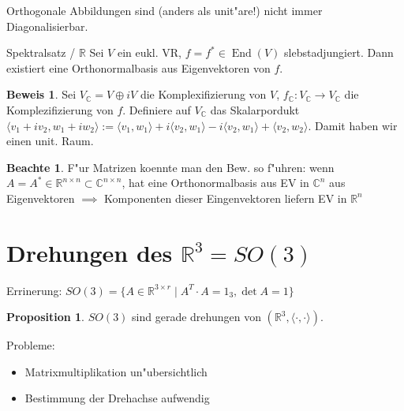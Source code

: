 \documentclass[oneside,fontsize=11pt,paper=a4,BCOR=0mm,DIV=12,automark,headsepline]{scrbook}
\DeclareMathOperator{\mEnd}{End}
\theoremstyle{remark}
\theoremstyle{definition}
\newtheorem*{notte}{Beachte}
\newtheorem*{proposition}{Proposition}
\theoremstyle{definition}
\newtheorem*{prof}{Beweis}
\theoremstyle{remark}
\begin{document}
\begin{relation}
  Orthogonale Abbildungen sind (anders als unit"are!) nicht immer Diagonalisierbar.
\end{relation}
\begin{satz}{Spektralsatz / $\mathbb{R}$}
  Sei $V$ ein eukl. VR, $f=f^* \in \mEnd (V)$ slebstadjungiert. Dann existiert
  eine Orthonormalbasis aus Eigenvektoren von $f$.
\end{satz}
\begin{prof}
  Sei $V_{\mathbb{C}}=V \oplus iV$ die Komplexifizierung von $V$,
  $f_{\mathbb{C}}: V_{\mathbb{C}} \rightarrow V_{\mathbb{C}}$ die
  Komplezifizierung von $f$. Definiere auf $V_{\mathbb{C}}$ das Skalarpordukt
  $\langle {v_1+ iv_2, w_1+ iw_2} \rangle := \langle {v_1, w_1} \rangle + i
  \langle {v_2, w_1} \rangle - i \langle {v_2, w_1} \rangle + \langle {v_2, w_2}
  \rangle$. Damit haben wir einen unit. Raum.
\end{prof}

\begin{notte}
  F"ur Matrizen koennte man den Bew. so f"uhren: wenn $A=A^* \in \mathbb{R}^{n
    \times n} \subset \mathbb{C}^{n\times n}$, hat eine Orthonormalbasis aus EV
  in $\mathbb{C}^n$ aus Eigenvektoren $\implies$ Komponenten dieser
  Eingenvektoren liefern EV in $\mathbb{R}^n$
\end{notte}


\section{Drehungen des $\mathbb{R}^3 = SO(3)$}
Errinerung: $SO(3) = \{A\in \mathbb{R}^{3\times r}\mid A^T \cdot A = 1_3, \det A
= 1\}$

\begin{proposition}
  $SO(3)$ sind gerade drehungen von $(\mathbb{R}^3, \langle\cdot  , \cdot \rangle)$.
\end{proposition}

Probleme:
\begin{itemize}
\item Matrixmultiplikation un"ubersichtlich
\item Bestimmung der Drehachse aufwendig
\end{itemize}
\end{document}
